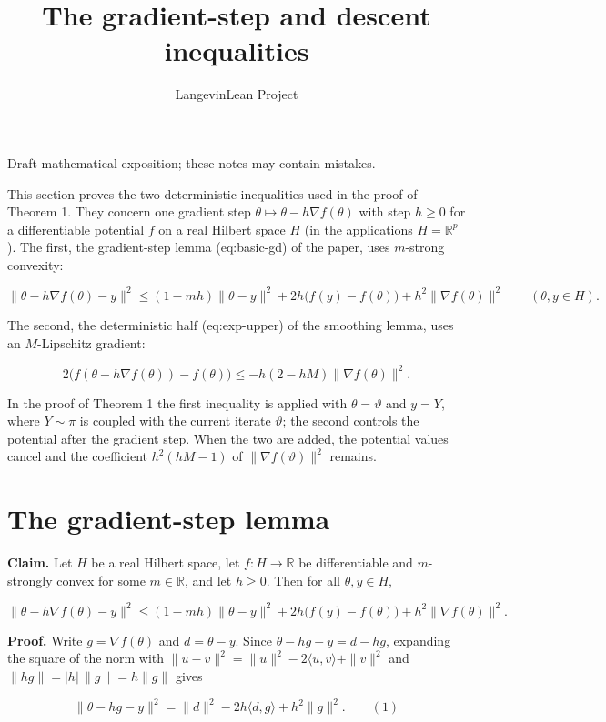 \documentclass[11pt,a4paper]{article}
\title{\texorpdfstring{The gradient-step and descent inequalities}{The gradient-step and descent inequalities}}
\author{LangevinLean Project}
\date{}
\begin{document}
\maketitle
Draft mathematical exposition; these notes may contain mistakes.


This section proves the two deterministic inequalities used in the proof of Theorem 1. They concern one gradient step \(\theta\mapsto\theta-h\nabla f(\theta)\) with step \(h\ge0\) for a differentiable potential \(f\) on a real Hilbert space \(H\) (in the applications \(H=\mathbb R^p\)). The first, the gradient-step lemma (eq:basic-gd) of the paper, uses \(m\)-strong convexity:


\[\|\theta-h\nabla f(\theta)-y\|^2\le(1-mh)\|\theta-y\|^2+2h\bigl(f(y)-f(\theta)\bigr)+h^2\|\nabla f(\theta)\|^2\qquad(\theta,y\in H).\]


The second, the deterministic half (eq:exp-upper) of the smoothing lemma, uses an \(M\)-Lipschitz gradient:


\[2\bigl(f(\theta-h\nabla f(\theta))-f(\theta)\bigr)\le-h(2-hM)\|\nabla f(\theta)\|^2.\]


In the proof of Theorem 1 the first inequality is applied with \(\theta=\vartheta\) and \(y=Y\), where \(Y\sim\pi\) is coupled with the current iterate \(\vartheta\); the second controls the potential after the gradient step. When the two are added, the potential values cancel and the coefficient \(h^2(hM-1)\) of \(\|\nabla f(\vartheta)\|^2\) remains.


\section{\texorpdfstring{The gradient-step lemma}{The gradient-step lemma}}


\textbf{Claim.} Let \(H\) be a real Hilbert space, let \(f:H\to\mathbb R\) be differentiable and \(m\)-strongly convex for some \(m\in\mathbb R\), and let \(h\ge0\). Then for all \(\theta,y\in H\),


\[\|\theta-h\nabla f(\theta)-y\|^2\le(1-mh)\|\theta-y\|^2+2h\bigl(f(y)-f(\theta)\bigr)+h^2\|\nabla f(\theta)\|^2.\]


\textbf{Proof.} Write \(g=\nabla f(\theta)\) and \(d=\theta-y\). Since \(\theta-hg-y=d-hg\), expanding the square of the norm with \(\|u-v\|^2=\|u\|^2-2\langle u,v\rangle+\|v\|^2\) and \(\|hg\|=|h|\,\|g\|=h\|g\|\) gives


\[\|\theta-hg-y\|^2=\|d\|^2-2h\langle d,g\rangle+h^2\|g\|^2.\qquad(1)\]
\end{document}

